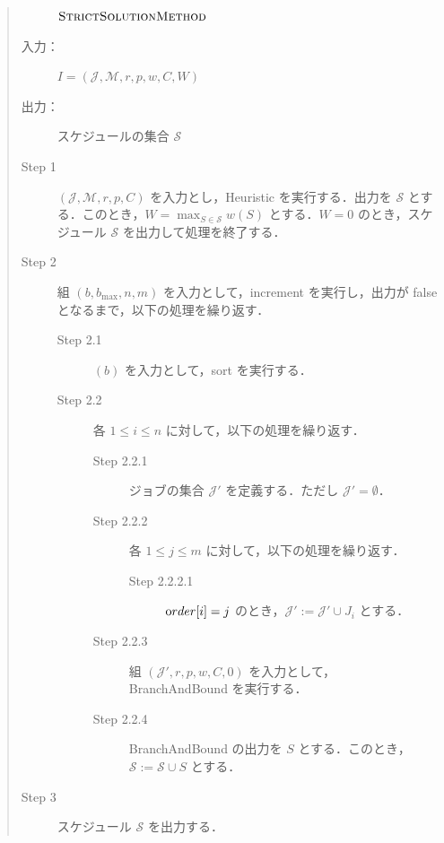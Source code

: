 \documentclass[12pt]{optlab-bachelor}
\begin{document}
\begin{quote}
  \begin{description}
    \item[] ${\mbox {\bf {\sc StrictSolutionMethod}}}$
    \item[入力：] $I = (\mathcal{J},\mathcal{M},r,p,w,C,W)$
    \item[出力：] スケジュールの集合 $\mathcal{S}$
  \end{description}
  \begin{description}
    \item[Step 1] $(\mathcal{J},\mathcal{M},r,p,C)$ を入力とし，{\sc Heuristic} を実行する．出力を $\mathcal{S}$ とする．このとき，$W = {\displaystyle \max_{S \in \mathcal{S}}w(S)}$ とする．$W = 0$ のとき，スケジュール $\mathcal{S}$ を出力して処理を終了する．
    \item[Step 2] 組 $(b,b_{\max},n,m)$ を入力として，{\sc increment} を実行し，出力が {\sc false} となるまで，以下の処理を繰り返す．
    \begin{description}
      \item[Step 2.1] $(b)$ を入力として，{\sc sort} を実行する．
      \item[Step 2.2] 各 $1 \le i \le n$ に対して，以下の処理を繰り返す．
      \begin{description}
        \item[Step 2.2.1] ジョブの集合 $\mathcal{J}'$ を定義する．ただし $\mathcal{J}' = \emptyset$．
        \item[Step 2.2.2] 各 $1 \le j \le m$ に対して，以下の処理を繰り返す．
        \begin{description}
          \item[Step 2.2.2.1] ${\mbox order}[i] = j$ のとき，$\mathcal{J}' :=\mathcal{J}' \cup J_i$ とする．
        \end{description}
        \item[Step 2.2.3] 組 $(\mathcal{J}',r,p,w,C,0)$ を入力として，
        \\ {\sc BranchAndBound} を実行する．
        \item[Step 2.2.4] {\sc BranchAndBound} の出力を $S$ とする．このとき，$\mathcal{S} := \mathcal{S} \cup S$ とする．
      \end{description}
    \end{description}
    \item[Step 3] スケジュール $\mathcal{S}$ を出力する．
  \end{description}
\end{quote}
\end{document}
